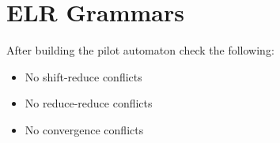 \section{ELR Grammars}
After building the pilot automaton check the following:
\begin{itemize}
    \item No shift-reduce conflicts
    \item No reduce-reduce conflicts
    \item No convergence conflicts
\end{itemize}
